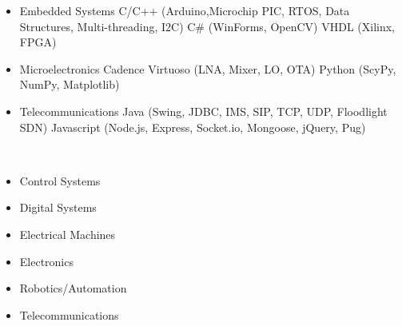 \documentclass[12pt, a4paper]{cv}
\begin{document}
\begin{minipage}{\linewidth}
\begin{itemize}
\item Embedded Systems
\subitem C/C++ (Arduino,Microchip PIC, RTOS, Data Structures, Multi-threading, I2C)
\subitem C\# (WinForms, OpenCV)
\subitem VHDL (Xilinx, FPGA)\newline\vspace{-2mm}
\item Microelectronics
\subitem Cadence Virtuoso (LNA, Mixer, LO, OTA)
\subitem Python (ScyPy, NumPy, Matplotlib)\newline\vspace{-2mm}
\item Telecommunications
\subitem Java (Swing, JDBC, IMS, SIP, TCP, UDP, Floodlight SDN)
\subitem Javascript (Node.js, Express, Socket.io, Mongoose, jQuery, Pug)\newline
\end{itemize}
\end{minipage}

\begin{minipage}{0.8\linewidth}
	 \newline
\end{minipage}\hfil
\begin{minipage}{0.2\linewidth}
	\begin{flushright}
	\end{flushright}
\end{minipage}\\

\begin{minipage}{0.5\linewidth}
\begin{itemize}
\item Control Systems
\item Digital Systems
\item Electrical Machines
\end{itemize}
\end{minipage}\hfil
\begin{minipage}{0.5\linewidth}
\begin{itemize}
\item Electronics
\item Robotics/Automation
\item Telecommunications
\end{itemize}
\end{minipage}
\end{document}
